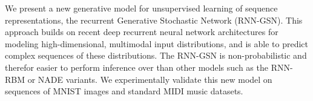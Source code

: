We present a new generative model for unsupervised learning of sequence representations, the recurrent Generative Stochastic Network (RNN-GSN). This approach builds on recent deep recurrent neural network architectures for modeling high-dimensional, multimodal input distributions, and is able to predict complex sequences of these distributions. The RNN-GSN is non-probabilistic and therefor easier to perform inference over than other models such as the RNN-RBM or NADE variants. We  experimentally validate  this new model on sequences of MNIST images and standard MIDI music datasets.
